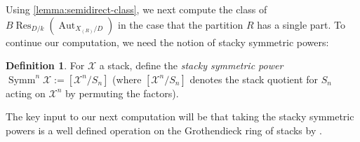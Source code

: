 \documentclass[12 pt]{amsart}
\newcommand{\rboxed}[1]{#1}
\theoremstyle{plain}
\theoremstyle{definition}
\newtheorem{definition}[theorem]{Definition}
\theoremstyle{remark}
\numberwithin{equation}{section}
\newcommand\scx{\mathscr X}
\DeclareMathOperator\res{Res}
\DeclareMathOperator\symm{Symm}
\DeclareMathOperator\aut{Aut}
\begin{document}
Using \autoref{lemma:semidirect-class}, we next compute the class of $B \res_{D/k}(\aut_{X_{(R)}/D})$ in the case that the partition $R$ has a single part. 
To continue our computation, we need the notion of stacky symmetric powers:
\begin{definition}
	\label{definition:stacky-symmetric-powers}
	For $\scx$ a
stack, define the {\em stacky symmetric power} $\rboxed{\symm^n \scx} :=
[\scx^n/S_n]$ (where $\rboxed{[\scx^n/S_n]}$ denotes the stack quotient for $S_n$
	acting on $\scx^n$ by permuting the factors). 
\end{definition}

The key input to our next computation will be
that taking the stacky symmetric powers is a well defined operation on the
Grothendieck ring of stacks by 
\cite[Prop.\
2.5]{ekedahlGeometricInvariantFinite2009}.
\end{document}
